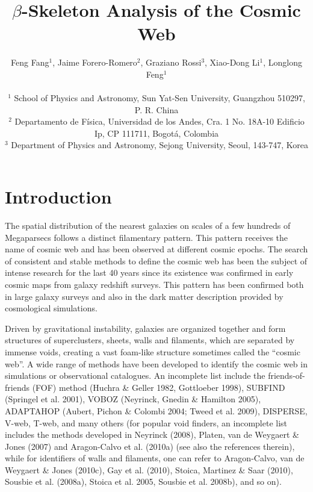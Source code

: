 \documentclass[useAMS,usenatbib]{mnras}
\begin{document}
\title[$\beta$-Skeleton Analysis]{$\beta$-Skeleton Analysis of the Cosmic Web}

\author[Fang, Forero-Romero, Rossi, Li \& Feng (2018)]
{Feng Fang$^1$, Jaime Forero-Romero$^2$, Graziano Rossi$^3$, Xiao-Dong Li$^1$, Longlong Feng$^1$ \\ \\
$^1$ School of Physics and Astronomy, Sun Yat-Sen University, Guangzhou 510297, P. R. China \\
$^2$ Departamento de F{\'i}sica, Universidad de los Andes, Cra. 1 No. 18A-10 Edificio Ip, CP 111711, Bogot{\'a}, Colombia \\
$^3$ Department of Physics and Astronomy, Sejong University, Seoul, 143-747, Korea}

\pagerange{\pageref{firstpage}--\pageref{lastpage}} 
\maketitle
\label{firstpage}


 

\section{Introduction}

The spatial distribution of the nearest galaxies on scales of a few
hundreds of Megaparsecs follows a distinct filamentary pattern.
This pattern receives the name of cosmic web and has been observed at
different cosmic epochs.  
The search of consistent and stable methods to define the cosmic web
has been the subject of intense research for the last 40 years since
its existence was confirmed in early cosmic maps from galaxy redshift
surveys.
This pattern has been confirmed both in large galaxy surveys and
also in the dark matter description provided by cosmological
simulations. 



Driven by gravitational instability, galaxies are organized together and form structures of superclusters, 
sheets, walls and filaments, which are separated by immense voids, 
creating a vast foam-like structure sometimes called the ``cosmic web''. 
A wide range of methods have been developed to identify the cosmic web in simulations or observational catalogues. 
An incomplete list include the friends-of-friends (FOF) method (Huchra \& Geller 1982, Gottloeber 1998), 
SUBFIND (Springel et al. 2001), VOBOZ (Neyrinck, Gnedin \& Hamilton 2005), 
ADAPTAHOP (Aubert, Pichon \& Colombi 2004; Tweed et al. 2009), 
DISPERSE, V-web, T-web, 
and many others 
(for popular void finders, an incomplete list includes the methods developed in Neyrinck (2008), Platen, van de Weygaert \& Jones (2007) 
and Aragon-Calvo et al. (2010a) (see also the references therein), 
while for identifiers of walls and filaments, one can refer to Aragon-Calvo, van de Weygaert \& Jones (2010c), 
Gay et al. (2010), Stoica, Martinez \& Saar (2010), Sousbie et al. (2008a), Stoica et al. 2005, Sousbie et al. 2008b), and so on).
\end{document}
